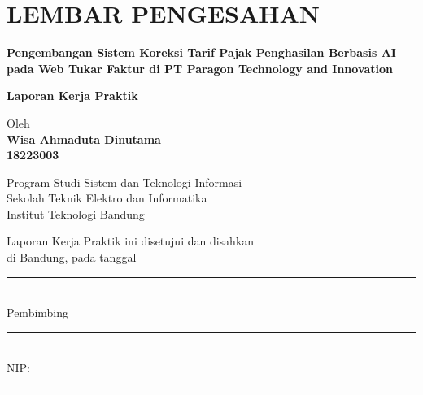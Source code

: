 \chapter*{LEMBAR PENGESAHAN}


\begin{center}
    \vspace{2cm}
  {\large\bfseries Pengembangan Sistem Koreksi Tarif Pajak Penghasilan Berbasis AI pada Web Tukar Faktur di PT Paragon Technology and Innovation}\\
     \vspace{2cm}

  {\Large \textbf{Laporan Kerja Praktik}}\\


  \vspace{1.5cm}
    
    
  {\large Oleh}\\[0.3cm]
    \textbf{
    {\large Wisa Ahmaduta Dinutama}\\
    {\large 18223003}
  }\\
    
  \vspace{0.5cm}
 
  {\large Program Studi Sistem dan Teknologi Informasi}\\
  {\large Sekolah Teknik Elektro dan Informatika}\\
  {\large Institut Teknologi Bandung}\\

  \vspace{1.5cm}

  Laporan Kerja Praktik ini disetujui dan disahkan\\
  di Bandung, pada tanggal \rule{3cm}{0.4pt}\\[1cm]

	Pembimbing \\[3cm]
	\rule{7cm}{0.4pt}\\[0.2cm]
	NIP: \rule{4cm}{0.4pt}

\end{center}

